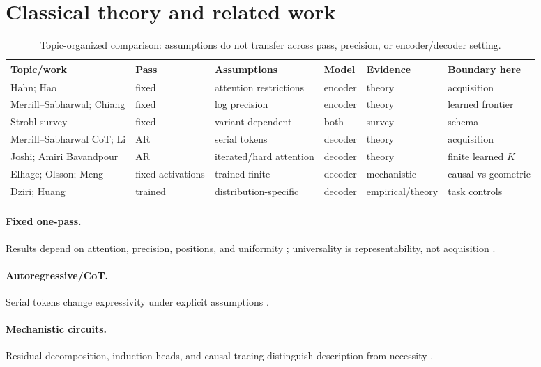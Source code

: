 \documentclass[10pt]{article}
\begin{document}
\section{Classical theory and related work}
\begin{table}[H]\centering\scriptsize
\begin{tabularx}{\linewidth}{p{.2\linewidth}p{.12\linewidth}p{.16\linewidth}p{.1\linewidth}YY}\toprule Topic/work&Pass&Assumptions&Model&Evidence&Boundary here\\\midrule Hahn; Hao&fixed&attention restrictions&encoder&theory&acquisition\\ Merrill--Sabharwal; Chiang&fixed&log precision&encoder&theory&learned frontier\\ Strobl survey&fixed&variant-dependent&both&survey&schema\\ Merrill--Sabharwal CoT; Li&AR&serial tokens&decoder&theory&acquisition\\ Joshi; Amiri Bavandpour&AR&iterated/hard attention&decoder&theory&finite learned $K$\\ Elhage; Olsson; Meng&fixed activations&trained finite&decoder&mechanistic&causal vs geometric\\ Dziri; Huang&trained&distribution-specific&decoder&empirical/theory&task controls\\\bottomrule\end{tabularx}
\caption{Topic-organized comparison: assumptions do not transfer across pass, precision, or encoder/decoder setting.}\end{table}
\paragraph{Fixed one-pass.} Results depend on attention, precision, positions, and uniformity \cite{hahn2020,hao2022,merrill2022,merrill2023parallel,merrill2023logic,chiang2023,strobl2024}; universality is representability, not acquisition \cite{yun2020,perez2021}.
\paragraph{Autoregressive/CoT.} Serial tokens change expressivity under explicit assumptions \cite{merrill2024cot,li2024,joshi2025,bavandpour2025}.
\paragraph{Mechanistic circuits.} Residual decomposition, induction heads, and causal tracing distinguish description from necessity \cite{elhage2021,olsson2022,meng2022}.
\end{document}
